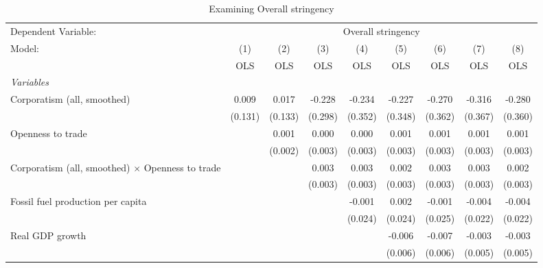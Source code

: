 
\begin{table}[htbp]
   \caption{Examining Overall stringency}
   \centering
   \begin{tabular}{lcccccccc}
      \toprule
      Dependent Variable: & \multicolumn{8}{c}{Overall stringency}\\
      Model:                                                  & (1)     & (2)     & (3)     & (4)     & (5)     & (6)     & (7)     & (8)\\  
                                                              &  OLS    & OLS     & OLS     & OLS     & OLS     & OLS     & OLS     & OLS\\  
      \midrule
      \emph{Variables}\\
      Corporatism (all, smoothed)                             & 0.009   & 0.017   & -0.228  & -0.234  & -0.227  & -0.270  & -0.316  & -0.280\\   
                                                              & (0.131) & (0.133) & (0.298) & (0.352) & (0.348) & (0.362) & (0.367) & (0.360)\\   
      Openness to trade                                       &         & 0.001   & 0.000   & 0.000   & 0.001   & 0.001   & 0.001   & 0.001\\   
                                                              &         & (0.002) & (0.003) & (0.003) & (0.003) & (0.003) & (0.003) & (0.003)\\   
      Corporatism (all, smoothed) $\times$ Openness to trade  &         &         & 0.003   & 0.003   & 0.002   & 0.003   & 0.003   & 0.002\\   
                                                              &         &         & (0.003) & (0.003) & (0.003) & (0.003) & (0.003) & (0.003)\\   
      Fossil fuel production per capita                       &         &         &         & -0.001  & 0.002   & -0.001  & -0.004  & -0.004\\   
                                                              &         &         &         & (0.024) & (0.024) & (0.025) & (0.022) & (0.022)\\   
      Real GDP growth                                         &         &         &         &         & -0.006  & -0.007  & -0.003  & -0.003\\   
                                                              &         &         &         &         & (0.006) & (0.006) & (0.005) & (0.005)\\   

\end{tabular}
\end{table}
